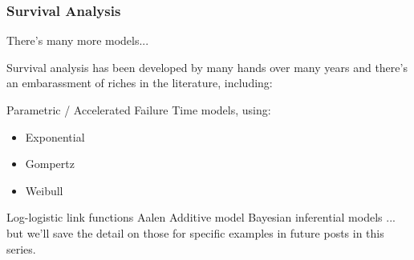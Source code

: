 	\begin{frame}
		\frametitle{Survival Analysis}
		There's many more models...
		
		Survival analysis has been developed by many hands over many years and there's an embarassment of riches in the literature, including:
		
		Parametric / Accelerated Failure Time models, using:
		\begin{itemize}
			\item Exponential
			\item Gompertz
			\item Weibull
		\end{itemize}
		
		
		Log-logistic link functions
		Aalen Additive model
		Bayesian inferential models
		... but we'll save the detail on those for specific examples in future posts in this series.
	\end{frame}
	
